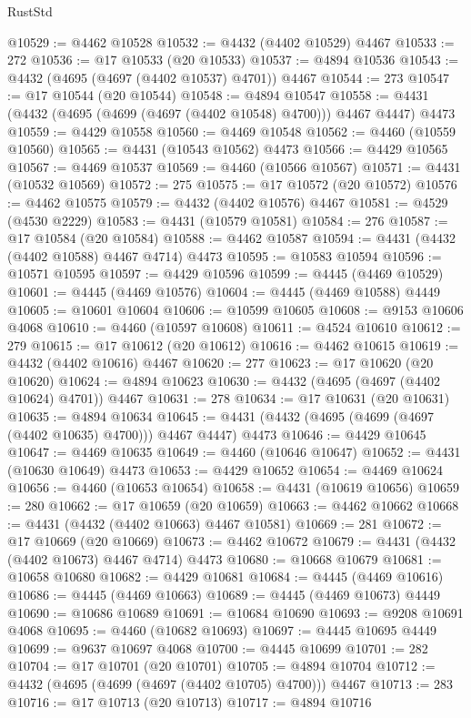 \begin{lexlean}{RustStd}
\begin{coremodule}
@10529 := @4462 @10528
@10532 := @4432 (@4402 @10529) @4467
@10533 := 272
@10536 := @17 @10533 (@20 @10533)
@10537 := @4894 @10536
@10543 := @4432 (@4695 (@4697 (@4402 @10537) @4701)) @4467
@10544 := 273
@10547 := @17 @10544 (@20 @10544)
@10548 := @4894 @10547
@10558 := @4431 (@4432 (@4695 (@4699 (@4697 (@4402 @10548) @4700))) @4467 @4447) @4473
@10559 := @4429 @10558
@10560 := @4469 @10548
@10562 := @4460 (@10559 @10560)
@10565 := @4431 (@10543 @10562) @4473
@10566 := @4429 @10565
@10567 := @4469 @10537
@10569 := @4460 (@10566 @10567)
@10571 := @4431 (@10532 @10569)
@10572 := 275
@10575 := @17 @10572 (@20 @10572)
@10576 := @4462 @10575
@10579 := @4432 (@4402 @10576) @4467
@10581 := @4529 (@4530 @2229)
@10583 := @4431 (@10579 @10581)
@10584 := 276
@10587 := @17 @10584 (@20 @10584)
@10588 := @4462 @10587
@10594 := @4431 (@4432 (@4402 @10588) @4467 @4714) @4473
@10595 := @10583 @10594
@10596 := @10571 @10595
@10597 := @4429 @10596
@10599 := @4445 (@4469 @10529)
@10601 := @4445 (@4469 @10576)
@10604 := @4445 (@4469 @10588) @4449
@10605 := @10601 @10604
@10606 := @10599 @10605
@10608 := @9153 @10606 @4068
@10610 := @4460 (@10597 @10608)
@10611 := @4524 @10610
@10612 := 279
@10615 := @17 @10612 (@20 @10612)
@10616 := @4462 @10615
@10619 := @4432 (@4402 @10616) @4467
@10620 := 277
@10623 := @17 @10620 (@20 @10620)
@10624 := @4894 @10623
@10630 := @4432 (@4695 (@4697 (@4402 @10624) @4701)) @4467
@10631 := 278
@10634 := @17 @10631 (@20 @10631)
@10635 := @4894 @10634
@10645 := @4431 (@4432 (@4695 (@4699 (@4697 (@4402 @10635) @4700))) @4467 @4447) @4473
@10646 := @4429 @10645
@10647 := @4469 @10635
@10649 := @4460 (@10646 @10647)
@10652 := @4431 (@10630 @10649) @4473
@10653 := @4429 @10652
@10654 := @4469 @10624
@10656 := @4460 (@10653 @10654)
@10658 := @4431 (@10619 @10656)
@10659 := 280
@10662 := @17 @10659 (@20 @10659)
@10663 := @4462 @10662
@10668 := @4431 (@4432 (@4402 @10663) @4467 @10581)
@10669 := 281
@10672 := @17 @10669 (@20 @10669)
@10673 := @4462 @10672
@10679 := @4431 (@4432 (@4402 @10673) @4467 @4714) @4473
@10680 := @10668 @10679
@10681 := @10658 @10680
@10682 := @4429 @10681
@10684 := @4445 (@4469 @10616)
@10686 := @4445 (@4469 @10663)
@10689 := @4445 (@4469 @10673) @4449
@10690 := @10686 @10689
@10691 := @10684 @10690
@10693 := @9208 @10691 @4068
@10695 := @4460 (@10682 @10693)
@10697 := @4445 @10695 @4449
@10699 := @9637 @10697 @4068
@10700 := @4445 @10699
@10701 := 282
@10704 := @17 @10701 (@20 @10701)
@10705 := @4894 @10704
@10712 := @4432 (@4695 (@4699 (@4697 (@4402 @10705) @4700))) @4467
@10713 := 283
@10716 := @17 @10713 (@20 @10713)
@10717 := @4894 @10716

\end{coremodule}
\end{lexlean}
